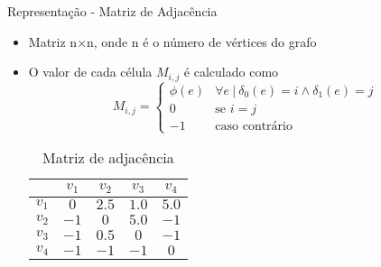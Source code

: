 \begin{frame}{Representação - Matriz de Adjacência}
    \begin{itemize}
        \item Matriz n$\times$n, onde n é o número de vértices do grafo
        \item O valor de cada célula $M_{i,j}$ é calculado como
        \begin{equation}
            M_{i,j} = \left\{ \begin{array}{ll}
                \phi(e) & \forall e \ |\ \delta_0(e) = i \land \delta_1(e) = j\\
                0 & \text{se } i = j \\
                -1 & \text{caso contrário}
            \end{array} \right.
        \end{equation}
        \begin{table}[htbp]
            \centering
            \begin{tabular}{|c|c|c|c|c|}
                \hline
                &   $v_1$   &   $v_2$   &   $v_3$   &   $v_4$\\
                \hline
                $v_1$ & $0$ & $2.5$ & $1.0$ & $5.0$ \\
                \hline
                $v_2$ & $-1$ & $0$ & $5.0$ & $-1$ \\
                \hline
                $v_3$ & $-1$ & $0.5$ & $0$ & $-1$ \\
                \hline
                $v_4$ & $-1$ & $-1$ & $-1$ & $0$ \\
                \hline
            \end{tabular}
            \caption[Matriz de adjacência]{Matriz de adjacência}
            \label{tab:MatrizAdj}
        \end{table}
    \end{itemize}
\end{frame}